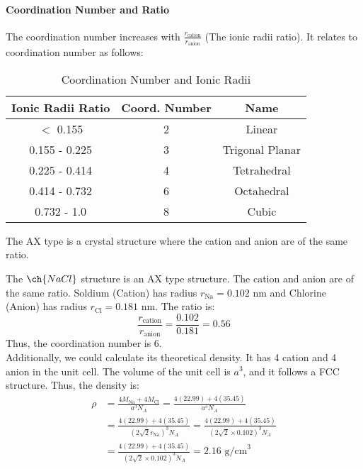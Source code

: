 \documentclass[11pt]{report}
\begin{document}
\paragraph{Coordination Number and Ratio} The coordination number increases with $\frac{r_{\text{cation}}}{r_{\text{anion}}}$ (The ionic radii ratio).  It relates to coordination number as follows:
\begin{table}[h]
    \centering
    \begin{tabular}{|c|c|c|}
        \hline
        \textbf{Ionic Radii Ratio} & \textbf{Coord. Number} & \textbf{Name} \\
        \hline
        $<$ 0.155 & 2 & Linear \\
        0.155 - 0.225 & 3 & Trigonal Planar \\
        0.225 - 0.414 & 4 & Tetrahedral \\
        0.414 - 0.732 & 6 & Octahedral \\
        0.732 - 1.0 & 8 & Cubic \\
        \hline
    \end{tabular}
    \caption{Coordination Number and Ionic Radii}
    \label{tab:coordination-number}
\end{table} 
\begin{definition}[AX Type]
    The AX type is a crystal structure where the cation and anion are of the same ratio. 
\end{definition}
\begin{example}
    The $\ch{NaCl}$ structure is an AX type structure. The cation and anion are of the same ratio. Soldium (Cation) has radius $r_{\text{Na}} = 0.102$ nm and Chlorine (Anion) has radius $r_{\text{Cl}} = 0.181$ nm. The ratio is:
    $$ \frac{r_{\text{cation}}}{r_{\text{anion}}} = \frac{0.102}{0.181} = 0.56 $$
    Thus, the coordination number is 6.\\
    Additionally, we could calculate its theoretical density. It has 4 cation and 4 anion in the unit cell. The volume of the unit cell is $a^3$, and it follows a FCC structure. Thus, the density is: 
    \begin{align*}
        \rho &= \frac{4M_{\text{Na}} + 4M_{\text{Cl}}}{a^3 N_A} = \frac{4(22.99) + 4(35.45)}{a^3 N_A} \\
        &= \frac{4(22.99) + 4(35.45)}{(2\sqrt{2}r_{\text{Na}})^3 N_A} = \frac{4(22.99) + 4(35.45)}{(2\sqrt{2} \times 0.102)^3 N_A} \\
        &= \frac{4(22.99) + 4(35.45)}{(2\sqrt{2} \times 0.102)^3 N_A} = 2.16 \text{ g/cm}^3
    \end{align*}
\end{example}
\end{document}
